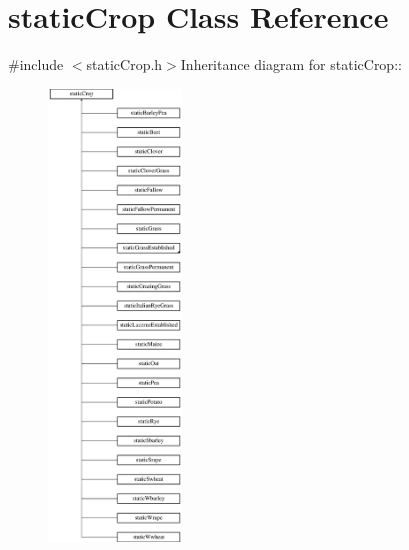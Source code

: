\hypertarget{classstatic_crop}{
\section{staticCrop Class Reference}
\label{classstatic_crop}
}


{\ttfamily \#include $<$staticCrop.h$>$}Inheritance diagram for staticCrop::\begin{figure}[H]
\begin{center}
\leavevmode
\includegraphics[height=12cm]{classstatic_crop}
\end{center}
\end{figure}

